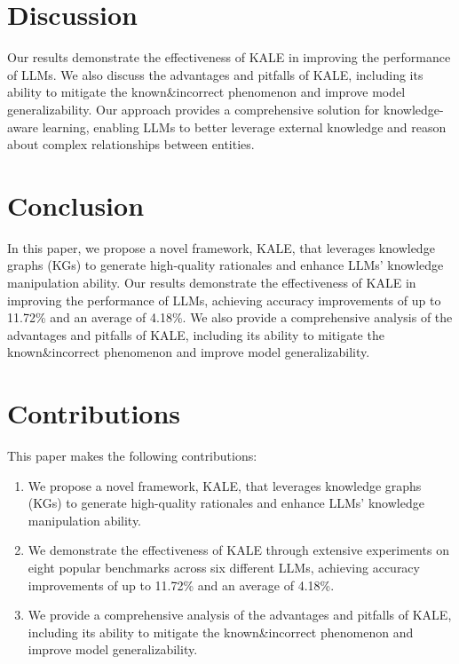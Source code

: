 \documentclass{article}
\begin{document}
        \section{Discussion}
        Our results demonstrate the effectiveness of KALE in improving the performance of LLMs. We also discuss the advantages and pitfalls of KALE, including its ability to mitigate the known&incorrect phenomenon and improve model generalizability. Our approach provides a comprehensive solution for knowledge-aware learning, enabling LLMs to better leverage external knowledge and reason about complex relationships between entities.

        \section{Conclusion}
        In this paper, we propose a novel framework, KALE, that leverages knowledge graphs (KGs) to generate high-quality rationales and enhance LLMs' knowledge manipulation ability. Our results demonstrate the effectiveness of KALE in improving the performance of LLMs, achieving accuracy improvements of up to 11.72\% and an average of 4.18\%. We also provide a comprehensive analysis of the advantages and pitfalls of KALE, including its ability to mitigate the known&incorrect phenomenon and improve model generalizability.

        \section{Contributions}
        This paper makes the following contributions:
        \begin{enumerate}[itemsep=0.2cm]
        \item We propose a novel framework, KALE, that leverages knowledge graphs (KGs) to generate high-quality rationales and enhance LLMs' knowledge manipulation ability.
        \item We demonstrate the effectiveness of KALE through extensive experiments on eight popular benchmarks across six different LLMs, achieving accuracy improvements of up to 11.72\% and an average of 4.18\%.
        \item We provide a comprehensive analysis of the advantages and pitfalls of KALE, including its ability to mitigate the known&incorrect phenomenon and improve model generalizability.
        \end{enumerate}

        
        

        
\end{document}
